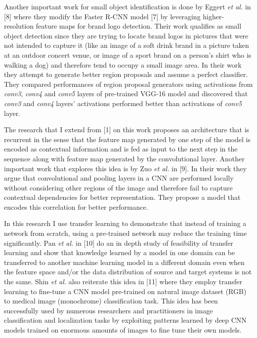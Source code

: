\documentclass [11pt,letterpaper ,twoside ,openany ]{report}
\begin{document}
    Another important work for small object identification is done by Eggert \textit{et al.} in [8] where they modify the Faster R-CNN model [7] by leveraging higher-resolution feature maps for brand logo detection. Their work qualifies as small object detection since they are trying to locate brand logos in pictures that were not intended to capture it (like an image of a soft drink brand in a picture taken at an outdoor concert venue, or image of a sport brand on a person's shirt who is walking a dog) and therefore tend to occupy a small image area. In their work they attempt to generate better region proposals and assume a perfect classifier. They compared performances of  region proposal generators using activations from \textit{conv3}, \textit{conv4} and \textit{conv5} layers of pre-trained VGG-16 model and discovered that \textit{conv3} and \textit{conv4} layers' activations performed better than activations of \textit{conv5} layer. 

    The research that I extend from [1] on this work proposes an architecture that is recurrent in the sense that the feature map generated by one step of the model is encoded as contextual information and is fed as input to the next step in the sequence along with feature map generated by the convolutional layer. Another important work that explores this idea is by Zuo \textit {et al.} in [9]. In their work they argue that convolutional and pooling layers in a CNN are performed locally without considering other regions of the image and therefore fail to capture contextual dependencies for better representation. They propose a model that encodes this correlation for better performance.

    In this research I use transfer learning to demonstrate that instead of training a network from scratch, using a pre-trained network may reduce  the training time significantly. Pan \textit {et al.} in [10] do an in depth study of feasibility of transfer learning and show that knowledge learned by a model in one domain can be transferred to another machine learning model in a different domain even when the feature space and/or the data distribution of source and target systems is not the same. Shin \textit {et al.} also reiterate this idea in [11] where they employ transfer learning to fine-tune a CNN model pre-trained on natural image dataset (RGB) to medical image (monochrome) classification task. This idea has been successfully used by numerous researchers and practitioners in image classification and localization tasks by exploiting patterns learned by deep CNN models trained on enormous amounts of images to fine tune their own models. 
\end{document}
